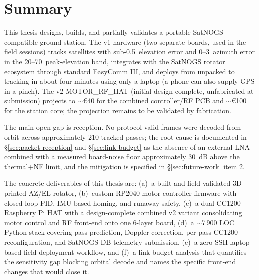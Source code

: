 \section{Summary}

This thesis designs, builds, and partially validates a portable SatNOGS-compatible ground station. The v1 hardware (two separate boards, used in the field sessions) tracks satellites with sub-0.5\degree\ elevation error and 0\degree--3\degree\ azimuth error in the 20\degree--70\degree\ peak-elevation band, integrates with the SatNOGS rotator ecosystem through standard EasyComm III, and deploys from unpacked to tracking in about four minutes using only a laptop (a phone can also supply GPS in a pinch). The v2 MOTOR\_RF\_HAT (initial design complete, unfabricated at submission) projects to $\sim$€40 for the combined controller/RF PCB and $\sim$€100 for the station core; the projection remains to be validated by fabrication.

The main open gap is reception. No protocol-valid frames were decoded from orbit across approximately 210 tracked passes; the root cause is documented in \S\ref{sec:packet-reception} and \S\ref{sec:link-budget} as the absence of an external LNA combined with a measured board-noise floor approximately 30~dB above the thermal+NF limit, and the mitigation is specified in \S\ref{sec:future-work} item 2.

The concrete deliverables of this thesis are: (a)~a built and field-validated 3D-printed AZ/EL rotator, (b)~custom RP2040 motor-controller firmware with closed-loop PID, IMU-based homing, and runaway safety, (c)~a dual-CC1200 Raspberry Pi HAT with a design-complete combined v2 variant consolidating motor control and RF front-end onto one 6-layer board, (d)~a $\sim$7\,900 LOC Python stack covering pass prediction, Doppler correction, per-pass CC1200 reconfiguration, and SatNOGS DB telemetry submission, (e)~a zero-SSH laptop-based field-deployment workflow, and (f)~a link-budget analysis that quantifies the sensitivity gap blocking orbital decode and names the specific front-end changes that would close it.